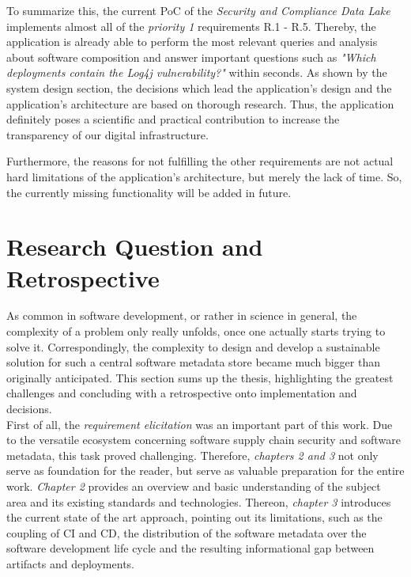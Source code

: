 To summarize this, the current PoC of the \emph{Security and Compliance Data Lake} implements almost all of the \emph{priority 1} requirements R.1 - R.5. Thereby, the application is already able to perform the most relevant queries and analysis about software composition and answer important questions such as \emph{"Which deployments contain the Log4j vulnerability?"} within seconds. As shown by the system design section, the decisions which lead the application's design and the application's architecture are based on thorough research. Thus, the application definitely poses a scientific and practical contribution to increase the transparency of our digital infrastructure.\par
Furthermore, the reasons for not fulfilling the other requirements are not actual hard limitations of the application's architecture, but merely the lack of time. So, the currently missing functionality will be added in future. %

\section{Research Question and Retrospective}
As common in software development, or rather in science in general, the complexity of a problem only really unfolds, once one actually starts trying to solve it. Correspondingly, the complexity to design and develop a sustainable solution for such a central software metadata store became much bigger than originally anticipated. This section sums up the thesis, highlighting the greatest challenges and concluding with a retrospective onto implementation and decisions.\\

First of all, the \emph{requirement elicitation} was an important part of this work. Due to the versatile ecosystem concerning software supply chain security and software metadata, this task proved challenging. Therefore, \emph{chapters 2 and 3} not only serve as foundation for the reader, but serve as valuable preparation for the entire work. %
\emph{Chapter 2} provides an overview and basic understanding of the subject area and its existing standards and technologies. Thereon, \emph{chapter 3} introduces the current state of the art approach, pointing out its limitations, such as the coupling of CI and CD, the distribution of the software metadata over the software development life cycle and the resulting informational gap between artifacts and deployments.\\

